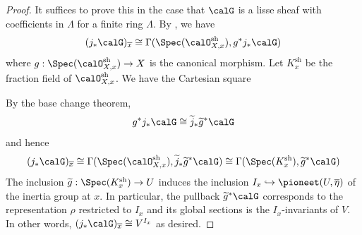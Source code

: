 \begin{proof}
    It suffices to prove this in the case that $\calG$ is a lisse sheaf with coefficients in $\Lambda$ for a finite ring $\Lambda$. By , we have 
    $$(j_* \calG)_{\overline{x}} \cong \Gamma(\Spec(\calO_{X,x}^{\text{sh}}), g^* j_* \calG)$$
    where $g: \Spec(\calO_{X,x}^{\text{sh}}) \to X$ is the canonical morphism. Let $K_x^{\text{sh}}$ be the fraction field of $\calO_{X,x}^{\text{sh}}$. We have the Cartesian square
    \begin{center}
    \end{center}
    By the base change theorem, 
    $$g^* j_* \calG \cong \widetilde{j}_*\widetilde{g}^* \calG$$
    and hence
    $$(j_* \calG)_{\overline{x}} \cong \Gamma(\Spec(\calO_{X,x}^{\text{sh}}), \widetilde{j}_*\widetilde{g}^* \calG) \cong \Gamma(\Spec(K_x^{\text{sh}}) , \widetilde{g}^* \calG)$$
    The inclusion $\widetilde{g}: \Spec(K_x^{\text{sh}}) \to U$ induces the inclusion $I_{x} \hookrightarrow \pioneet(U, \overline{\eta})$ of the inertia group at $x$. In particular, the pullback $\widetilde{g}^* \calG$ corresponds to the representation $\rho$ restricted to $I_{x}$ and its global sections is the $I_x$-invariants of $V$. In other words, $(j_* \calG)_{\overline{x}} \cong V^{I_x}$ as desired.
\end{proof}


